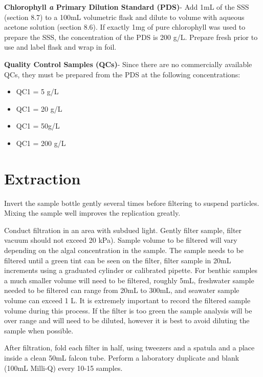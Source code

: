 \documentclass[12pt]{../SOP2}
\begin{document}
\NP \textbf{Chlorophyll \textit{a} Primary Dilution Standard (PDS)}- Add 1mL of the SSS (section 8.7) to a 100mL volumetric flask and dilute to volume with aqueous acetone solution (section 8.6). If exactly 1mg of pure chlorophyll was used to prepare the SSS, the concentration of the PDS is 200 \micro g/L. Prepare fresh prior to use and label flask and wrap in foil.

\NP \textbf{Quality Control Samples (QCs)}- Since there are no commercially available QCs, they must be prepared from the PDS at the following concentrations:
\begin{itemize}
\item QC1 = 5 \micro g/L
\item QC1 = 20 \micro g/L
\item QC1 = 50\micro g/L
\item QC1 = 200 \micro g/L
\end{itemize}

\section{Extraction}
\NP Invert the sample bottle gently several times before filtering to suspend particles. Mixing the sample well improves the replication greatly.

\NP Conduct filtration in an area with subdued light. Gently filter sample, filter vacuum should not exceed 20 kPa). Sample volume to be filtered will vary depending on the algal concentration in the sample. The sample needs to be filtered until a green tint can be seen on the filter, filter sample in 20mL increments using a graduated cylinder or calibrated pipette. For benthic samples a much smaller volume will need to be filtered, roughly 5mL, freshwater sample needed to be filtered can range from 20mL to 300mL, and seawater sample volume can exceed 1 L. It is extremely important to record the filtered sample volume during this process. If the filter is too green the sample analysis will be over range and will need to be diluted, however it is best to avoid diluting the sample when possible. 

\NP After filtration, fold each filter in half, using tweezers and a spatula and a place inside a clean 50mL falcon tube. Perform a laboratory duplicate and blank (100mL Milli-Q) every 10-15 samples.
\end{document}
